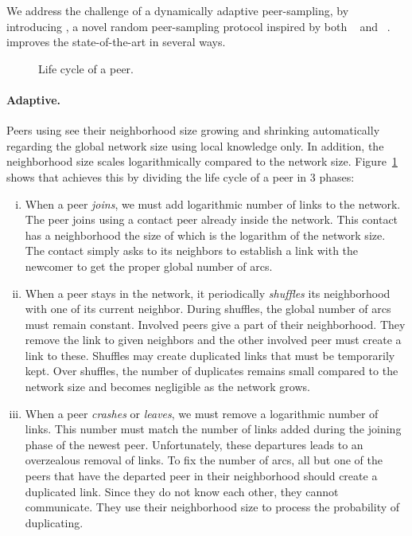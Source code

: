 We address the challenge of a dynamically adaptive peer-sampling,
by introducing \SPRAY, a novel random peer-sampling protocol inspired by both
\SCAMP~\cite{ganesh2001scamp,ganesh2003peer} and
\CYCLON~\cite{voulgaris2005cyclon}. \SPRAY improves the state-of-the-art in
several ways.

\begin{figure}
  \begin{center}
    \hspace{20pt}
    \hspace{20pt}
    \caption{\label{fig:cycle} Life cycle of a peer.}
  \end{center}
\end{figure}

\paragraph{Adaptive.}
Peers using \SPRAY see their neighborhood size growing and shrinking
automatically regarding the global network size using local knowledge only. In
addition, the neighborhood size scales logarithmically compared to the network
size. Figure~\ref{fig:cycle} shows that \SPRAY achieves this by dividing the
life cycle of a peer in 3 phases:
\begin{enumerate}[(i)]
\item When a peer \emph{joins}, we must add logarithmic number of links to the
  network. The peer joins using a contact peer already inside the network. This
  contact has a neighborhood the size of which is the logarithm of the network
  size. The contact simply asks to its neighbors to establish a link with the
  newcomer to get the proper global number of arcs.
\item When a peer stays in the network, it periodically \emph{shuffles} its
  neighborhood with one of its current neighbor. During shuffles, the global
  number of arcs must remain constant. Involved peers give a part of their
  neighborhood. They remove the link to given neighbors and the other involved
  peer must create a link to these. Shuffles may create duplicated links that
  must be temporarily kept.  Over shuffles, the number of duplicates remains
  small compared to the network size and becomes negligible as the network
  grows.
\item When a peer \emph{crashes} or \emph{leaves}, we must remove a logarithmic
  number of links. This number must match the number of links added during the
  joining phase of the newest peer. Unfortunately, these departures leads to an
  overzealous removal of links. To fix the number of arcs, all but one of the
  peers that have the departed peer in their neighborhood should create a
  duplicated link. Since they do not know each other, they cannot
  communicate. They use their neighborhood size to process the probability of
  duplicating.
\end{enumerate}

